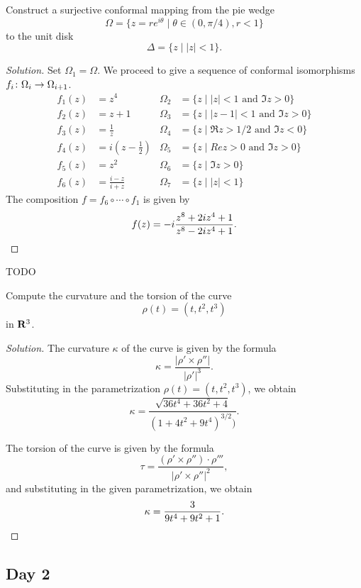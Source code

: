 
Construct a surjective conformal mapping from the pie wedge
\[
\Omega = \{ z = r e^{i \theta} \;|\; \theta \in (0, \pi/4), r < 1 \}
\]
to the unit disk
\[
\Delta = \{ z \;|\; |z| < 1 \}.
\]

\begin{proof}[Solution]
  Set $\Omega_1 = \Omega$. We proceed to give a sequence of conformal isomorphisms $f_i \colon \Omega_i \rightarrow \Omega_{i+1}$.
  \begin{align*}
    f_1(z) &= z^4 &
    \Omega_2 &= \{ z \;|\; |z| < 1 \textrm{ and } \Im z > 0 \} \\
    f_2(z) &= z+1 &
    \Omega_3 &= \{ z \;|\; |z-1| < 1 \textrm{ and } \Im z > 0 \} \\
    f_3(z) &= \frac{1}{z} &
    \Omega_4 &= \{ z \;|\; \Re z > 1/2 \textrm{ and } \Im z < 0 \} \\
    f_4(z) &= i \left( z - \frac{1}{2} \right) &
    \Omega_5 &= \{ z \;|\; Re z > 0 \textrm{ and } \Im z > 0 \} \\
    f_5(z) &= z^2 &
    \Omega_6 &= \{ z \;|\; \Im z > 0 \} \\
    f_6(z) &= \frac{i-z}{i+z} &
    \Omega_7 &= \{ z \;|\; |z| < 1 \}
  \end{align*}
  The composition $f = f_6 \circ \cdots \circ f_1$ is given by
  \[
  f(z) = -i \frac{z^8 + 2 i z^4 + 1}{z^8 - 2 i z^4 + 1}. \qedhere
  \]
\end{proof}


TODO

Compute the curvature and the torsion of the curve
	\[
	\rho(t) = (t, t^2, t^3)
	\]
in $\mathbf{R}^3$.

\begin{proof}[Solution]
  The curvature $\kappa$ of the curve is given by the formula
  \[
  \kappa = \frac{|\rho' \times \rho''|}{|\rho'|^3}.
  \]
  Substituting in the parametrization $\rho(t) = (t, t^2, t^3)$, we obtain
  \[
  \kappa = \frac{\sqrt{36t^4 + 36t^2 + 4}}{(1 + 4t^2 + 9t^4)^{3/2})}.
  \]
  
  The torsion of the curve is given by the formula
  \[
  \tau = \frac{(\rho' \times \rho'')\cdot \rho'''}{|\rho' \times \rho''|^2},
  \]
  and substituting in the given parametrization, we obtain
  \[
  \kappa = \frac{3}{9t^4 + 9t^2 + 1}. \qedhere
  \]
\end{proof}

\subsection{Day 2}
\label{S:fall-2007-2}
\mbox{}

